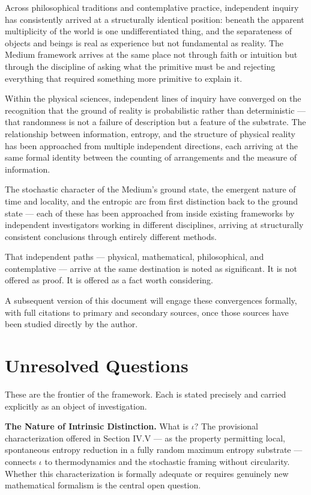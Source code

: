 \documentclass[11pt]{article}
\begin{document}
Across philosophical traditions and contemplative practice, independent inquiry
has consistently arrived at a structurally identical position: beneath the
apparent multiplicity of the world is one undifferentiated thing, and the
separateness of objects and beings is real as experience but not fundamental as
reality. The Medium framework arrives at the same place not through faith or
intuition but through the discipline of asking what the primitive must be and
rejecting everything that required something more primitive to explain it.

Within the physical sciences, independent lines of inquiry have converged on the
recognition that the ground of reality is probabilistic rather than deterministic
— that randomness is not a failure of description but a feature of the substrate.
The relationship between information, entropy, and the structure of physical
reality has been approached from multiple independent directions, each arriving
at the same formal identity between the counting of arrangements and the measure
of information.

The stochastic character of the Medium's ground state, the emergent nature of
time and locality, and the entropic arc from first distinction back to the ground
state — each of these has been approached from inside existing frameworks by
independent investigators working in different disciplines, arriving at
structurally consistent conclusions through entirely different methods.

That independent paths — physical, mathematical, philosophical, and contemplative
— arrive at the same destination is noted as significant. It is not offered as
proof. It is offered as a fact worth considering.

A subsequent version of this document will engage these convergences formally,
with full citations to primary and secondary sources, once those sources have
been studied directly by the author.
\section{Unresolved Questions}
\label{sec:org0c8e1eb}

These are the frontier of the framework. Each is stated precisely and carried
explicitly as an object of investigation.

\textbf{The Nature of Intrinsic Distinction.} What is \(\iota\)? The provisional
characterization offered in Section IV.V — as the property permitting local,
spontaneous entropy reduction in a fully random maximum entropy substrate —
connects \(\iota\) to thermodynamics and the stochastic framing without
circularity. Whether this characterization is formally adequate or requires
genuinely new mathematical formalism is the central open question.
\end{document}
